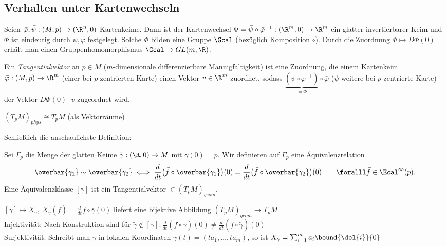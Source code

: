 \subsection*{Verhalten unter Kartenwechseln}
	
	Seien $ \bar{\varphi},\bar{\psi}: (M,p) \to (\R^n,0) $ Kartenkeime. Dann ist der Kartenwechsel $ \Phi = \bar{\psi} \circ \bar{\varphi}^{-1}: (\R^m,0) \to \R^m $ ein glatter invertierbarer Keim und $\Phi$ ist eindeutig durch $ \psi,\varphi $ festgelegt. Solche $\Phi$ bilden eine Gruppe $\Gcal$ (bezüglich Komposition $\circ$). Durch die Zuordnung $ \Phi \mapsto D\Phi(0) $ erhält man einen Gruppenhomomorphismus $ \Gcal \to GL(m,\R) $.

\begin{defn}
	Ein \emph{Tangentialvektor} an $p \in M$ ($m$-dimensionale differenzierbare Mannigfaltigkeit) ist eine Zuordnung, die einem Kartenkeim $ \bar{\varphi}: (M,p) \to \R^m $ (einer bei $p$ zentrierten Karte) einen Vektor $v \in \R^m$ zuordnet, sodass $ \underbrace{(\overbar{\psi \circ \varphi^{-1}})}_{=\Phi} \circ \bar{\varphi} $ ($\psi$ weitere bei $p$ zentrierte Karte) der Vektor $D\Phi(0) \cdot v$ zugeordnet wird.
\end{defn}

\begin{lem}\label{2.7}
	$ (T_pM)_{phys} \cong T_pM $ (als Vektorräume)
\end{lem}

Schließlich die anschaulichste Definition:

\begin{defn}
	Sei $ \Gamma_p $ die Menge der glatten Keime $ \bar{\gamma}: (\R,0) \to M $ mit $\gamma(0) = p$. Wir definieren auf $\Gamma_p$ eine Äquivalenzrelation 
	\[ \overbar{\gamma_1} \sim \overbar{\gamma_2} \iff \frac{d}{d t}\big( \bar{f} \circ \overbar{\gamma_1} \big)(0) = \frac{d}{d t}\big( \bar{f} \circ \overbar{\gamma_2} \big)(0) \qquad \foralll \bar{f} \in \Ecal^\infty(p). \]
	Eine Äquivalenzklasse $[\gamma]$ ist ein Tangentialvektor $ \in (T_pM)_{geom} $.
\end{defn}

\begin{rem*}
	$ [\gamma] \mapsto X_\gamma,\ X_\gamma(\bar{f}) = \frac{d}{dt} \bar{f} \circ \bar{\gamma} (0) $ liefert eine bijektive Abbildung $ (T_pM)_{geom} \to T_pM $\\
	Injektivität: Nach Konstruktion sind für $ \tilde{\gamma} \notin [\gamma]: \frac{d}{dt}(\bar{f} \circ \bar{\gamma}) (0) \neq \frac{d}{dt}(\bar{f} \circ \bar{\tilde{\gamma}}) (0) $\\
	Surjektivität: Schreibt man $\gamma$ in lokalen Koordinaten $\gamma(t) = (ta_1,\dotsc,ta_m)$, so ist $X_\gamma = \sum_{i=1}^{m} a_i \bound{\del{i}}{0}.$
\end{rem*}

